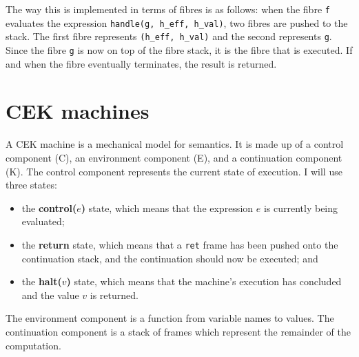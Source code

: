 \documentclass[12pt,a4paper,twoside,openright]{report}
\begin{document}
The way this is implemented in terms of fibres is as follows: when the fibre \texttt{f} evaluates the expression \texttt{handle(g, h\_eff, h\_val)}, two fibres are pushed to the stack. The first fibre represents \texttt{(h\_eff, h\_val)} and the second represents \texttt{g}. Since the fibre \texttt{g} is now on top of the fibre stack, it is the fibre that is executed. If and when the fibre eventually terminates, the result is returned.

\section{CEK machines}\label{prepcek}

A CEK machine is a mechanical model for semantics. It is made up of a control component (C), an environment component (E), and a continuation component (K). The control component represents the current state of execution. I will use three states:

\begin{itemize}
\item the \textbf{control($e$)} state, which means that the expression $e$ is currently being evaluated;
\item the \textbf{return} state, which means that a \texttt{ret} frame has been pushed onto the continuation stack, and the continuation should now be executed; and
\item the \textbf{halt($v$)} state, which means that the machine's execution has concluded and the value $v$ is returned.
\end{itemize}

The environment component is a function from variable names to values. The continuation component is a stack of frames which represent the remainder of the computation.
\end{document}
